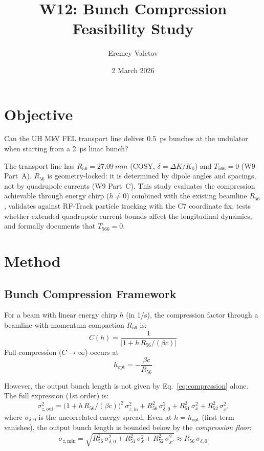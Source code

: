 \documentclass[11pt]{article}
\title{W12: Bunch Compression Feasibility Study}
\author{Eremey Valetov}
\date{2 March 2026}
\begin{document}
\maketitle

\section{Objective}

Can the UH MkV FEL transport line deliver \SI{0.5}{ps} bunches at the
undulator when starting from a \SI{2}{ps} linac bunch?

The transport line has $R_{56} = \SI{27.09}{mm}$ (COSY, $\delta = \Delta K/K_0$)
and $T_{566} = 0$ (W9 Part~A).  $R_{56}$ is geometry-locked: it is determined
by dipole angles and spacings, not by quadrupole currents (W9 Part~C).
This study evaluates the compression achievable through energy chirp
($h \neq 0$) combined with the existing beamline $R_{56}$, validates against
RF-Track particle tracking with the C7 coordinate fix, tests whether extended
quadrupole current bounds affect the longitudinal dynamics, and formally
documents that $T_{566} = 0$.


\section{Method}

\subsection{Bunch Compression Framework}

For a beam with linear energy chirp $h$ (in 1/s), the compression factor
through a beamline with momentum compaction $R_{56}$ is:
\begin{equation}
  C(h) = \frac{1}{|1 + h\,R_{56}/(\beta c)|}
  \label{eq:compression}
\end{equation}
Full compression ($C \to \infty$) occurs at
\begin{equation}
  h_\text{opt} = -\frac{\beta c}{R_{56}}
  \label{eq:hopt}
\end{equation}

However, the output bunch length is not given by Eq.~\eqref{eq:compression}
alone.  The full expression (1st order) is:
\begin{equation}
  \sigma_{z,\text{out}}^2 = \bigl(1 + h\,R_{56}/(\beta c)\bigr)^2\,\sigma_{z,\text{in}}^2
    + R_{56}^2\,\sigma_{\delta,0}^2
    + R_{51}^2\,\sigma_x^2 + R_{52}^2\,\sigma_{x'}^2
  \label{eq:sigma-z-full}
\end{equation}
where $\sigma_{\delta,0}$ is the uncorrelated energy spread.  Even at
$h = h_\text{opt}$ (first term vanishes), the output bunch length is bounded
below by the \emph{compression floor}:
\begin{equation}
  \sigma_{z,\text{min}} = \sqrt{R_{56}^2\,\sigma_{\delta,0}^2
    + R_{51}^2\,\sigma_x^2 + R_{52}^2\,\sigma_{x'}^2}
  \approx R_{56}\,\sigma_{\delta,0}
  \label{eq:floor}
\end{equation}
\end{document}
